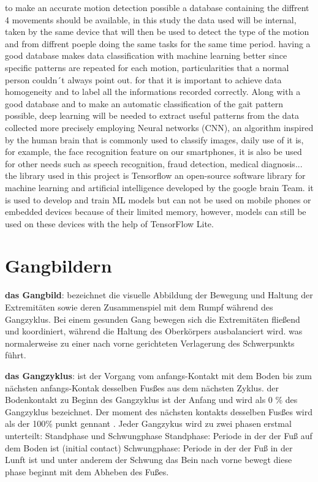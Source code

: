 to make an accurate motion detection possible a database containing the diffrent 4 movements should be available, in this study the data used will be internal, taken by the same device that will then be used to detect the type of the motion and from diffrent poeple doing the same tasks for the same time period. having a good database makes data classification with machine learning better since specific patterns are repeated for each motion, particularities that a normal person couldn´t always point out. for that it is  important to achieve data homogeneity and to label all the informations recorded correctly. 
Along with a good database and to make an automatic classification of the gait pattern possible, deep learning will be needed to extract useful patterns from the data collected more precisely employing Neural networks (CNN), an algorithm inspired by the human brain that is commonly used to classify images, daily use of it is, for example, the face recognition feature on our smartphones, it is also be used for other needs such as speech recognition, fraud detection, medical diagnosis...
the library used in this project is Tensorflow an open-source software library for machine learning and artificial intelligence developed by the google brain Team. it is used to develop and train ML models but can not be used on mobile phones or embedded devices because of their limited memory, however, models can still be used on these devices with the help of TensorFlow Lite.

\section{Gangbildern}

\hfill \break
\textbf{das Gangbild}: bezeichnet die visuelle Abbildung der Bewegung und Haltung der Extremitäten sowie deren Zusammenspiel mit dem Rumpf während des Gangzyklus. 
Bei einem gesunden Gang bewegen sich die Extremitäten fließend und koordiniert, während die Haltung des Oberkörpers ausbalanciert wird. was normalerweise zu einer nach vorne gerichteten Verlagerung des Schwerpunkts führt. 

\hfill \break
\textbf{das Gangzyklus}: ist der Vorgang vom anfangs-Kontakt mit dem Boden bis zum nächsten anfangs-Kontak desselben Fusßes aus dem n\"achsten Zyklus. 
der Bodenkontakt zu Beginn des Gangzyklus ist der Anfang und wird als 0 \% des Gangzyklus bezeichnet. Der moment des nächsten kontakts desselben Fusßes wird als der 100\% punkt gennant .
Jeder Gangzykus wird zu zwei phasen erstmal unterteilt: Standphase und Schwungphase
Standphase: Periode in der der Fuß auf dem Boden ist (initial contact)
Schwungphase: Periode in der der Fuß in der Lunft ist und unter anderem der Schwung das Bein nach vorne bewegt diese phase beginnt mit dem Abheben des Fußes.

